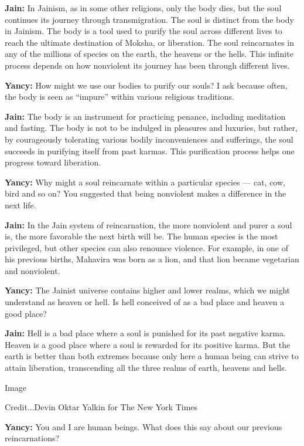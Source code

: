 \textbf{Jain:} In Jainism, as in some other religions, only the body
dies, but the soul continues its journey through transmigration. The
soul is distinct from the body in Jainism. The body is a tool used to
purify the soul across different lives to reach the ultimate destination
of Moksha, or liberation. The soul reincarnates in any of the millions
of species on the earth, the heavens or the hells. This infinite process
depends on how nonviolent its journey has been through different lives.

\textbf{Yancy:} How might we use our bodies to purify our souls? I ask
because often, the body is seen as ``impure'' within various religious
traditions.

\textbf{Jain:} The body is an instrument for practicing penance,
including meditation and fasting. The body is not to be indulged in
pleasures and luxuries, but rather, by courageously tolerating various
bodily inconveniences and sufferings, the soul succeeds in purifying
itself from past karmas. This purification process helps one progress
toward liberation.

\textbf{Yancy:} Why might a soul reincarnate within a particular species
--- cat, cow, bird and so on? You suggested that being nonviolent makes
a difference in the next life.

\textbf{Jain:} In the Jain system of reincarnation, the more nonviolent
and purer a soul is, the more favorable the next birth will be. The
human species is the most privileged, but other species can also
renounce violence. For example, in one of his previous births, Mahavira
was born as a lion, and that lion became vegetarian and nonviolent.

\textbf{Yancy:} The Jainist universe contains higher and lower realms,
which we might understand as heaven or hell. Is hell conceived of as a
bad place and heaven a good place?

\textbf{Jain:} Hell is a bad place where a soul is punished for its past
negative karma. Heaven is a good place where a soul is rewarded for its
positive karma. But the earth is better than both extremes because only
here a human being can strive to attain liberation, transcending all the
three realms of earth, heavens and hells.

Image

Credit...Devin Oktar Yalkin for The New York Times

\textbf{Yancy:} You and I are human beings. What does this say about our
previous reincarnations?

